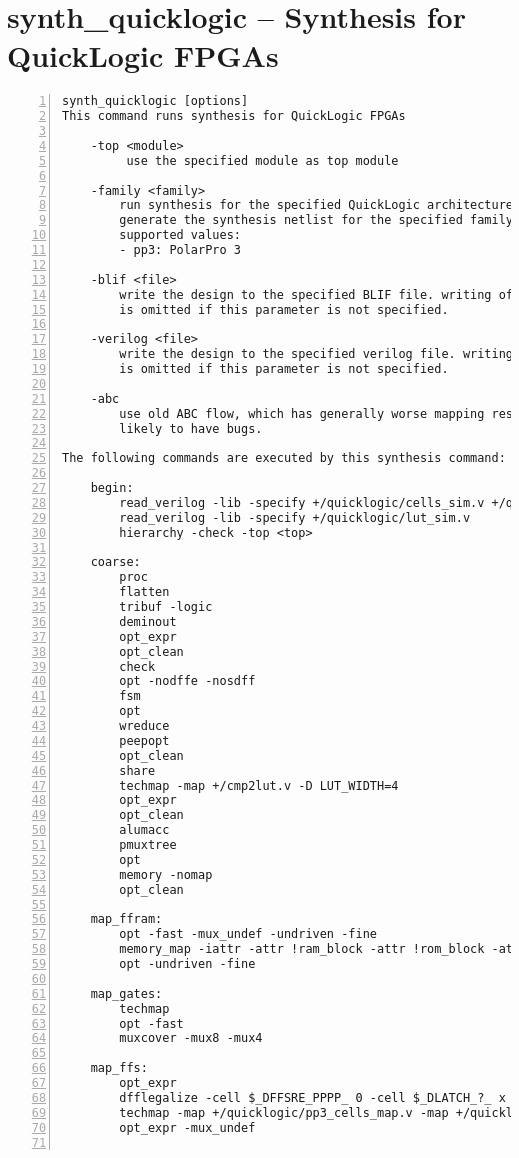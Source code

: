 \section{synth\_quicklogic -- Synthesis for QuickLogic FPGAs}
\label{cmd:synth_quicklogic}
\begin{lstlisting}[numbers=left,frame=single]
   synth_quicklogic [options]
This command runs synthesis for QuickLogic FPGAs

    -top <module>
         use the specified module as top module

    -family <family>
        run synthesis for the specified QuickLogic architecture
        generate the synthesis netlist for the specified family.
        supported values:
        - pp3: PolarPro 3 

    -blif <file>
        write the design to the specified BLIF file. writing of an output file
        is omitted if this parameter is not specified.

    -verilog <file>
        write the design to the specified verilog file. writing of an output file
        is omitted if this parameter is not specified.

    -abc
        use old ABC flow, which has generally worse mapping results but is less
        likely to have bugs.

The following commands are executed by this synthesis command:

    begin:
        read_verilog -lib -specify +/quicklogic/cells_sim.v +/quicklogic/pp3_cells_sim.v
        read_verilog -lib -specify +/quicklogic/lut_sim.v
        hierarchy -check -top <top>

    coarse:
        proc
        flatten
        tribuf -logic
        deminout
        opt_expr
        opt_clean
        check
        opt -nodffe -nosdff
        fsm
        opt
        wreduce
        peepopt
        opt_clean
        share
        techmap -map +/cmp2lut.v -D LUT_WIDTH=4
        opt_expr
        opt_clean
        alumacc
        pmuxtree
        opt
        memory -nomap
        opt_clean

    map_ffram:
        opt -fast -mux_undef -undriven -fine
        memory_map -iattr -attr !ram_block -attr !rom_block -attr logic_block -attr syn_ramstyle=auto -attr syn_ramstyle=registers -attr syn_romstyle=auto -attr syn_romstyle=logic
        opt -undriven -fine

    map_gates:
        techmap
        opt -fast
        muxcover -mux8 -mux4

    map_ffs:
        opt_expr
        dfflegalize -cell $_DFFSRE_PPPP_ 0 -cell $_DLATCH_?_ x
        techmap -map +/quicklogic/pp3_cells_map.v -map +/quicklogic/pp3_ffs_map.v
        opt_expr -mux_undef


\end{lstlisting}
